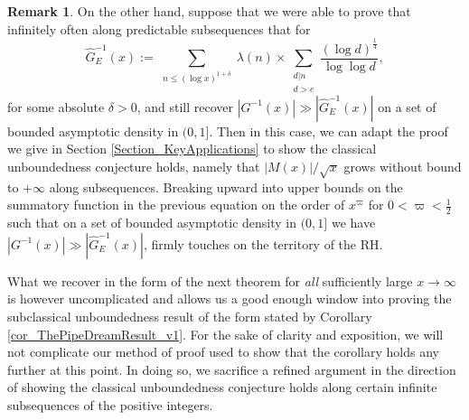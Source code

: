 \documentclass[11pt,reqno,a4letter]{article}
\numberwithin{figure}{section}
\numberwithin{table}{section}
\theoremstyle{plain}
\numberwithin{theorem}{section}
\theoremstyle{definition}
\newtheorem{remark}[theorem]{Remark}
\begin{document}
\begin{remark}
On the other hand, suppose that we were able to prove that infinitely often along predictable 
subsequences that for 
\[
\widehat{G}_E^{-1}(x) := \sum_{\substack{n \leq (\log x)^{1+\delta}}} \lambda(n) \times 
     \sum_{\substack{d|n \\ d > e}} \frac{(\log d)^{\frac{1}{4}}}{\log\log d}, 
\]
for some absolute $\delta > 0$, 
and still recover $|G^{-1}(x)| \gg |\widehat{G}_E^{-1}(x)|$ on a set of bounded asymptotic density in 
$(0, 1]$. Then in this case, we can adapt the proof we give 
in Section \ref{Section_KeyApplications} to show the classical unboundedness conjecture 
holds, namely that $|M(x)| / \sqrt{x}$ grows without bound to $+\infty$ along subsequences. 
Breaking upward into upper bounds on the summatory function in the previous equation on the order of 
$x^{\varpi}$ for $0 < \varpi < \frac{1}{2}$ such that on a set of bounded asymptotic density in 
$(0, 1]$ we have $|G^{-1}(x)| \gg |\widehat{G}_E^{-1}(x)|$, firmly touches on the territory of the RH. 
\end{remark} 

What we recover in the form of the next theorem for \emph{all} sufficiently large $x \rightarrow \infty$ 
is however uncomplicated and allows us a good enough window into proving the subclassical unboundedness 
result of the form stated by Corollary \ref{cor_ThePipeDreamResult_v1}. 
For the sake of clarity and exposition, we will not complicate our method of proof used to show that 
the corollary holds any further at this point. In doing so, we sacrifice a refined 
argument in the direction of showing the classical unboundedness conjecture holds along certain 
infinite subsequences of the positive integers. 
\end{document}
